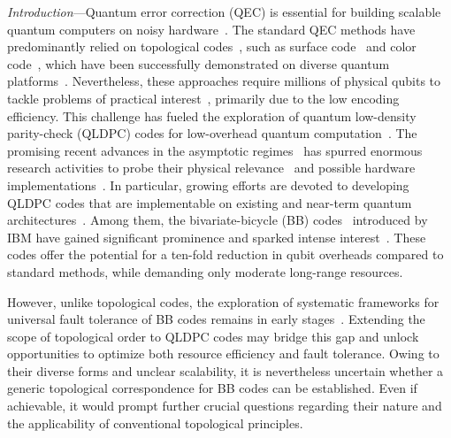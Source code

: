 \documentclass[aps,prl,english,superscriptaddress,twocolumn,tightenlines,showpacs,longbibliography,floatfix,amsfonts]{revtex4-2}
\begin{document}
	\emph{Introduction}---Quantum error correction (QEC) is essential for building scalable quantum computers on noisy hardware~\cite{Shor95,Steane96,Knill97, Kitaev03,Gottesman97,Dennis02}.
	The standard QEC methods have predominantly relied on topological codes~\cite{Dennis02,Terhal15,Campbell17,Fowler12}, such as surface code~\cite{Kitaev03, Bravyi98} and color code~\cite{Bombin06, Bombin07}, which have been successfully demonstrated on diverse quantum platforms~\cite{Satzinger21,Krinner22,USTC22,USTC23,Google24a,Quantinuum24,QuEra24,Monz21,Blatt14}.
	Nevertheless, these approaches require millions of physical qubits to tackle problems of practical interest~\cite{Litinski19,Gidney21,Alexeev21,Beverland21,Beverland22}, primarily due to the low encoding efficiency.
	This challenge has fueled the exploration of quantum low-density parity-check (QLDPC) codes for low-overhead quantum computation~\cite{Gottesman14,MacKay04,Kovalev13,Tillich14,Bravyi14}.
	The promising recent advances in the asymptotic regimes~\cite{Hastings20,Panteleev21,Panteleev22,Panteleev22b,Breuckmann21a,Breuckmann21b,Leverrier22} has spurred enormous research activities to probe their physical relevance~\cite{Rakovszky23,Rakovszky24,DeRoeck24,Yin24,liang2024extracting, liang2024operator,Zhu25} and possible hardware implementations~\cite{Tremblay22,Bravyi24,Xu24,Nguyen24,Tamiya24}.
	In particular, growing efforts are devoted to developing QLDPC codes that are implementable on existing and near-term quantum architectures~\cite{Tremblay22, Wang22, Bravyi24, Xu24, Hong24, Lin24, Pecorari25, Ruiz25, Scruby24, Zhang25}. 
	Among them, the bivariate-bicycle (BB) codes~\cite{Bravyi24} introduced by IBM have gained significant prominence and sparked intense interest~\cite{Bravyi22, Berthusen25, Poole24, Gong24, Shaw24, Wang24, Sayginel24, eberhardt2024pruning,Cross24,Cowtan24,Eberhardt24,Williamson24}.
	These codes offer the potential for a ten-fold reduction in qubit overheads compared to standard methods, while demanding only moderate long-range resources.
	
	However, unlike topological codes, 
	the exploration of systematic frameworks for universal fault tolerance of BB codes remains in early stages~\cite{Cross24,Cowtan24,He25Extractors,Eberhardt24,Williamson24}.
	Extending the scope of topological order to QLDPC codes may bridge this gap and unlock opportunities to optimize both resource efficiency and fault tolerance.
	Owing to their diverse forms and unclear scalability, it is nevertheless uncertain whether a generic topological correspondence for BB codes can be established. 
	Even if achievable, it would prompt further crucial questions regarding their nature and the applicability of conventional topological principles.
	
\end{document}
